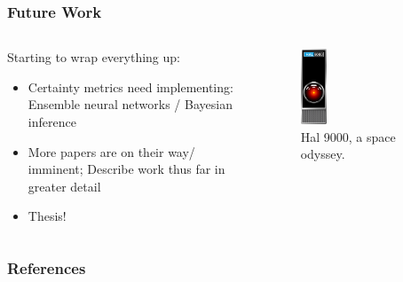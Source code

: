 \documentclass[aspectratio=169]{beamer}
\begin{document}
  \begin{frame}
    \frametitle{Future Work}
    \begin{columns}
      \begin{column}{0.5\textwidth}
        Starting to wrap everything up:
        \begin{itemize}
          \item Certainty metrics need implementing: Ensemble neural networks / Bayesian inference
          \item More papers are on their way/ imminent; Describe work thus far in greater detail
          \item Thesis!
        \end{itemize}
      \end{column}
      \begin{column}{0.5\textwidth}
        \begin{figure}[th!]
          \centering
          \includegraphics[width=0.22\textwidth]{hal9000.pdf}
          \caption{Hal 9000, a space odyssey.}
          \label{fig:hal}
        \end{figure}
      \end{column}
    \end{columns}
  \end{frame}

  \begin{frame}[allowframebreaks]
    \frametitle{References}
    \printbibliography
  \end{frame}
\end{document}
